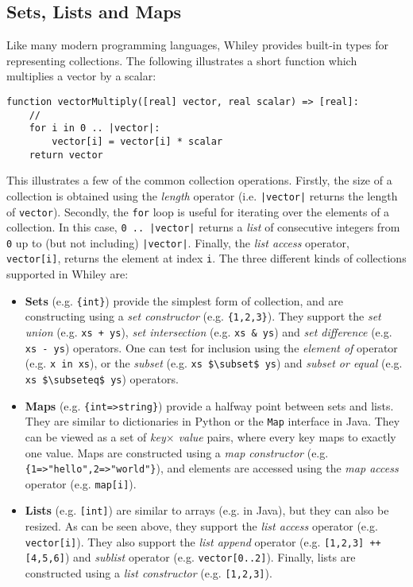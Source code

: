 \subsection{Sets, Lists and Maps}
\label{walkthrough_collections}
Like many modern programming languages, Whiley provides built-in types
for representing collections.  The following illustrates a short
function which multiplies a vector by a scalar:
\begin{lstlisting}
function vectorMultiply([real] vector, real scalar) => [real]:
    //
    for i in 0 .. |vector|:
        vector[i] = vector[i] * scalar
    return vector
\end{lstlisting}
This illustrates a few of the common collection operations.  Firstly,
the size of a collection is obtained using the {\em length} operator
(i.e. \lstinline{|vector|} returns the length of \lstinline{vector}).
Secondly, the \lstinline{for} loop is useful for iterating over the
elements of a collection.  In this case, \lstinline{0 .. |vector|}
returns a {\em list} of consecutive integers from \lstinline{0} up to
(but not including) \lstinline{|vector|}.  Finally, the {\em list
  access} operator, \lstinline{vector[i]}, returns the element at
index \lstinline{i}.  The three different kinds of collections
supported in Whiley are:
\begin{itemize}
\item {\bf Sets} (e.g. \lstinline|{int}|) provide the simplest form of collection, and are constructing using a {\em set constructor} (e.g. \lstinline|{1,2,3}|).  They support the {\em set union} (e.g. \lstinline{xs + ys}), {\em set intersection} (e.g. \lstinline{xs & ys}) and {\em set difference} (e.g. \lstinline{xs - ys}) operators.  One can test for inclusion using the {\em element of} operator (e.g. \lstinline{x in xs}), or the {\em subset} (e.g. \lstinline{xs $\subset$ ys}) and {\em subset or equal} (e.g. \lstinline{xs $\subseteq$ ys}) operators.
  
\item {\bf Maps} (e.g. \lstinline|{int=>string}|) provide a halfway point between sets and lists.  They are similar to dictionaries in Python or the \lstinline{Map} interface in Java.  They can be viewed as a set of {\em key$\times$ value} pairs, where every key maps to exactly one value.  Maps are constructed using a {\em map constructor} (e.g. \lstinline|{1=>"hello",2=>"world"}|), and elements are accessed using the {\em map access} operator (e.g. \lstinline{map[i]}).  

\item {\bf Lists} (e.g. \lstinline{[int]}) are similar to arrays
  (e.g. in Java), but they can also be resized.  As can be seen above,
  they support the {\em list access} operator
  (e.g. \lstinline{vector[i]}).  They also support the {\em list
    append} operator (e.g. \lstinline{[1,2,3] ++ [4,5,6]}) and {\em
    sublist} operator (e.g. \lstinline{vector[0..2]}).  Finally, lists are constructed using a {\em list constructor} (e.g. \lstinline{[1,2,3]}).

\end{itemize}

